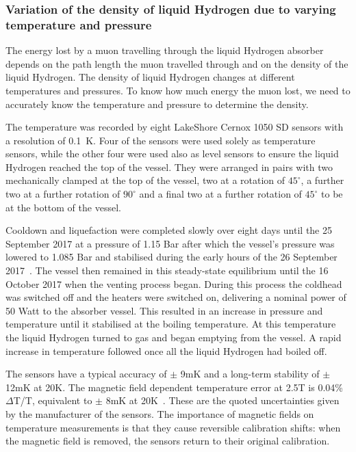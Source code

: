\subsubsection{Variation of the density of liquid Hydrogen due to varying temperature and pressure}
\label{SubSect:Absorber_temperature}

 The energy lost by a muon travelling through the liquid Hydrogen absorber depends on the path length the
 muon travelled through and on the density of the liquid Hydrogen. The density of liquid Hydrogen changes
 at different temperatures and pressures. To know how much energy the muon lost, we need to accurately know
 the temperature and pressure to determine the density. 
 
 The temperature was recorded by eight LakeShore Cernox 1050 SD sensors with a resolution of 0.1~K.
 Four of the sensors were used solely as temperature sensors, while the other four were used also as level
 sensors to ensure the liquid Hydrogen reached the top of the vessel.
 They were arranged in pairs
 with two mechanically clamped at the  top of the vessel, two at a rotation of ${45}^{\circ}$, a further two at a further rotation of
 ${90}^{\circ}$ and a final two at a further rotation of ${45}^{\circ}$ to be at the bottom of the vessel.

Cooldown and liquefaction were completed slowly over eight days until the 25 September 2017 at a pressure of 1.15 Bar after which the vessel's pressure was lowered to 1.085 Bar and stabilised during the early hours of the 26 September 2017~\cite{1748-0221-13-09-T09008}. The vessel then remained in this steady-state equilibrium until the 16 October 2017 when the venting process began. During this process the coldhead was switched off and the heaters were switched on, delivering a nominal power of 50 Watt to the absorber vessel. This resulted in an increase in pressure and temperature until it stabilised at the boiling temperature. At this temperature the liquid Hydrogen turned to gas and began emptying from the vessel. A rapid increase in temperature followed once all the liquid Hydrogen had boiled off.

The sensors have a typical accuracy of $\mathrm{\pm}$ 9mK and a long-term stability of $\mathrm{\pm}$ 12mK at 20K. The magnetic field dependent temperature error at 2.5T is 0.04\% $\Delta$T/T, equivalent to $\mathrm{\pm}$ 8mK at 20K~\cite{CernoxRTDs}\cite{TemperatureMeasurement}. These are the quoted uncertainties given by the manufacturer of the sensors. The importance of magnetic fields on temperature measurements is that they cause reversible calibration shifts: when the magnetic field is removed, the sensors return to their original calibration.

